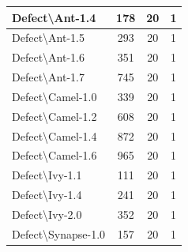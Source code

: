 \documentclass[]{svjour3}
\begin{document}
\begin{table}[]
\begin{tabular}{|l|c|c|c|}
Defect\textbackslash{}Ant-1.4       & 178                                & 20                                                  & 1                                                  \\ \hline
Defect\textbackslash{}Ant-1.5       & 293                                & 20                                                  & 1                                                  \\ \hline
Defect\textbackslash{}Ant-1.6       & 351                                & 20                                                  & 1                                                  \\ \hline
Defect\textbackslash{}Ant-1.7       & 745                                & 20                                                  & 1                                                  \\ \hline
Defect\textbackslash{}Camel-1.0     & 339                                & 20                                                  & 1                                                  \\ \hline
Defect\textbackslash{}Camel-1.2     & 608                                & 20                                                  & 1                                                  \\ \hline
Defect\textbackslash{}Camel-1.4     & 872                                & 20                                                  & 1                                                  \\ \hline
Defect\textbackslash{}Camel-1.6     & 965                                & 20                                                  & 1                                                  \\ \hline
Defect\textbackslash{}Ivy-1.1       & 111                                & 20                                                  & 1                                                  \\ \hline
Defect\textbackslash{}Ivy-1.4       & 241                                & 20                                                  & 1                                                  \\ \hline
Defect\textbackslash{}Ivy-2.0       & 352                                & 20                                                  & 1                                                  \\ \hline
Defect\textbackslash{}Synapse-1.0   & 157                                & 20                                                  & 1                                                  \\ \hline

\end{tabular}
\end{table}
\end{document}
